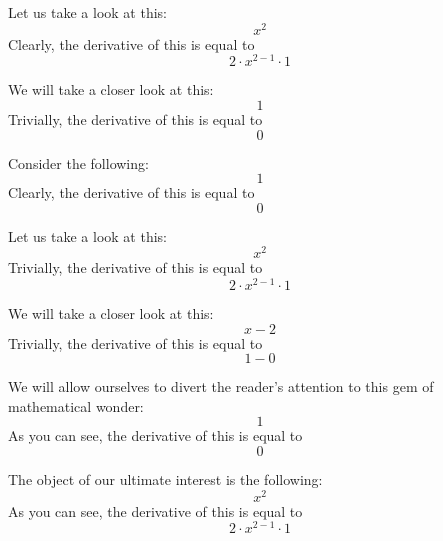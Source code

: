\documentclass{article}
\begin{document}
Let us take a look at this:
\begin{equation}
x ^{2 } 
\end{equation}
Clearly, the derivative of this is equal to
\begin{equation}
2 \cdot x ^{2 - 1 } \cdot 1 
\end{equation}

We will take a closer look at this:
\begin{equation}
1 
\end{equation}
Trivially, the derivative of this is equal to
\begin{equation}
0 
\end{equation}

Consider the following:
\begin{equation}
1 
\end{equation}
Clearly, the derivative of this is equal to
\begin{equation}
0 
\end{equation}

Let us take a look at this:
\begin{equation}
x ^{2 } 
\end{equation}
Trivially, the derivative of this is equal to
\begin{equation}
2 \cdot x ^{2 - 1 } \cdot 1 
\end{equation}

We will take a closer look at this:
\begin{equation}
x - 2 
\end{equation}
Trivially, the derivative of this is equal to
\begin{equation}
1 - 0 
\end{equation}

We will allow ourselves to divert the reader's attention to this gem of mathematical wonder:
\begin{equation}
1 
\end{equation}
As you can see, the derivative of this is equal to
\begin{equation}
0 
\end{equation}

The object of our ultimate interest is the following:
\begin{equation}
x ^{2 } 
\end{equation}
As you can see, the derivative of this is equal to
\begin{equation}
2 \cdot x ^{2 - 1 } \cdot 1 
\end{equation}
\end{document}
